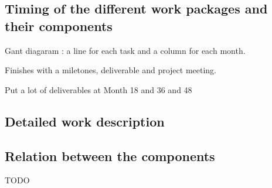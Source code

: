 \wpfigstyle{\footnotesize}

\subsection{Timing of the different work packages and their components}

Gant diagaram : a line for each task
and a column for each month.

Finishes with a miletones, deliverable and project meeting.

Put a lot of deliverables at Month 18 and 36 and 48

\ganttchart[draft,xscale=.35] 


\subsection{Detailed work description}

\begin{workplan}
\newpage

\newpage  

\newpage  

\newpage  

\newpage

\newpage

\newpage

\newpage

\newpage

\end{workplan}



\subsection{Relation between the components}


{\color{red} TODO}

